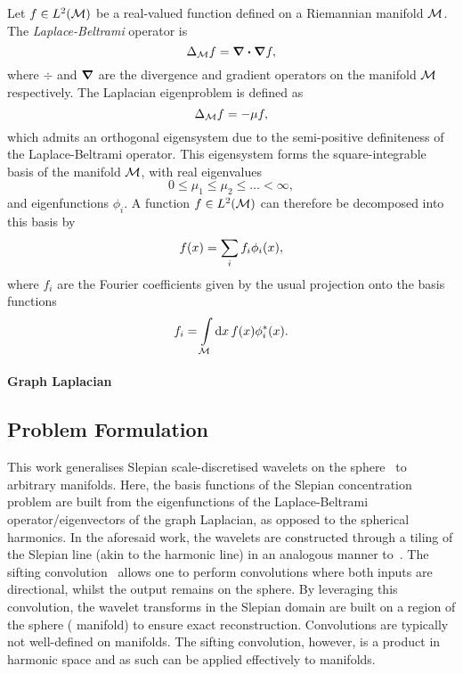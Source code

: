 Let \(f \in L^{2}(\mathcal{M})\) be a real-valued function defined on a Riemannian manifold \(\mathcal{M}{}\).
The \emph{Laplace-Beltrami} operator is
%
\begin{equation}
	\Delta_{\mathcal{M}} f
	= \div{\grad{f}},
\end{equation}
%
where \(\div{}\) and \(\grad{}\) are the divergence and gradient operators on the manifold \(\mathcal{M}{}\) respectively.
The Laplacian eigenproblem is defined as
%
\begin{equation}
	\Delta_{\mathcal{M}} f
	= -\mu f,
\end{equation}
%
which admits an orthogonal eigensystem due to the semi-positive definiteness of the Laplace-Beltrami operator.
This eigensystem forms the square-integrable basis of the manifold \(\mathcal{M}{}\), with real eigenvalues
%
\begin{equation}
	0 \leq \mu_{1} \leq \mu_{2} \leq \ldots < \infty, %
\end{equation}
%
and eigenfunctions \(\phi_{i}\).
A function \(f \in L^{2}(\mathcal{M})\) can therefore be decomposed into this basis by
%
\begin{equation}
	f(x)
	= \sum\limits_{i} f_{i} \phi_{i}(x),
\end{equation}
%
where \(f_{i}\) are the Fourier coefficients given by the usual projection onto the basis functions
%
\begin{equation}
	f_{i}
	= \int\limits_{\mathcal{M}} \dd{x} f(x) \phi_{i}^{\ast}(x).
\end{equation}



\paragraph{Graph Laplacian}

\subsection{Problem Formulation}\label{sec:chapter4_problem_formulation}

This work generalises Slepian scale-discretised wavelets on the sphere~\cite{Roddy2021a} to arbitrary manifolds.
Here, the basis functions of the Slepian concentration problem are built from the eigenfunctions of the Laplace-Beltrami operator/eigenvectors of the graph Laplacian, as opposed to the spherical harmonics.
In the aforesaid work, the wavelets are constructed through a tiling of the Slepian line (akin to the harmonic line) in an analogous manner to~\cite{Wiaux2008,McEwen2018}.
The sifting convolution~\cite{Roddy2021} allows one to perform convolutions where both inputs are directional, whilst the output remains on the sphere.
By leveraging this convolution, the wavelet transforms in the Slepian domain are built on a region of the sphere (\cf{} manifold) to ensure exact reconstruction.
Convolutions are typically not well-defined on manifolds.
The sifting convolution, however, is a product in harmonic space and as such can be applied effectively to manifolds.

